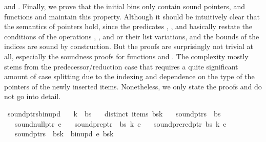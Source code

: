 \begin{isabellebody}
\begin{isamarkuptext}
and . Finally, we prove that the initial bins only contain sound pointers, and functions 
and  maintain this property. Although it should be intuitively clear that the
semantics of pointers hold, since the predicates , , and  basically
restate the conditions of the operations , , and  or their list variations,
and the bounds of the indices are sound by construction. But the proofs are surprisingly not trivial at all, especially the soundness
proofs for functions  and . The complexity mostly stems from
the predecessor/reduction case that requires a quite significant amount of case splitting due to the indexing and dependence
on the type of the pointers of the newly inserted items. Nonetheless, we only state the proofs and do not go into detail.%
\end{isamarkuptext}\isamarkuptrue%
\isamarkupfalse%
\ sound{\isacharunderscore}{\kern0pt}ptrs{\isacharunderscore}{\kern0pt}bin{\isacharunderscore}{\kern0pt}upd{\isacharcolon}{\kern0pt}\isanewline
\ \ \ {\isachardoublequoteopen}k\ {\isacharless}{\kern0pt}\ {\isacharbar}{\kern0pt}bs{\isacharbar}{\kern0pt}{\isachardoublequoteclose}\isanewline
\ \ \ {\isachardoublequoteopen}distinct\ {\isacharparenleft}{\kern0pt}items\ {\isacharparenleft}{\kern0pt}bs{\isacharbang}{\kern0pt}k{\isacharparenright}{\kern0pt}{\isacharparenright}{\kern0pt}{\isachardoublequoteclose}\isanewline
\ \ \ {\isachardoublequoteopen}sound{\isacharunderscore}{\kern0pt}ptrs\ {\isasymomega}\ bs{\isachardoublequoteclose}\isanewline
\ \ \ {\isachardoublequoteopen}sound{\isacharunderscore}{\kern0pt}null{\isacharunderscore}{\kern0pt}ptr\ e{\isachardoublequoteclose}\isanewline
\ \ \ {\isachardoublequoteopen}sound{\isacharunderscore}{\kern0pt}pre{\isacharunderscore}{\kern0pt}ptr\ {\isasymomega}\ bs\ k\ e{\isachardoublequoteclose}\isanewline
\ \ \ {\isachardoublequoteopen}sound{\isacharunderscore}{\kern0pt}prered{\isacharunderscore}{\kern0pt}ptr\ bs\ k\ e{\isachardoublequoteclose}\isanewline
\ \ \ {\isachardoublequoteopen}sound{\isacharunderscore}{\kern0pt}ptrs\ {\isasymomega}\ {\isacharparenleft}{\kern0pt}bs{\isacharbrackleft}{\kern0pt}k\ {\isacharcolon}{\kern0pt}{\isacharequal}{\kern0pt}\ bin{\isacharunderscore}{\kern0pt}upd\ e\ {\isacharparenleft}{\kern0pt}bs{\isacharbang}{\kern0pt}k{\isacharparenright}{\kern0pt}{\isacharbrackright}{\kern0pt}{\isacharparenright}{\kern0pt}{\isachardoublequoteclose}%

\end{isabellebody}
